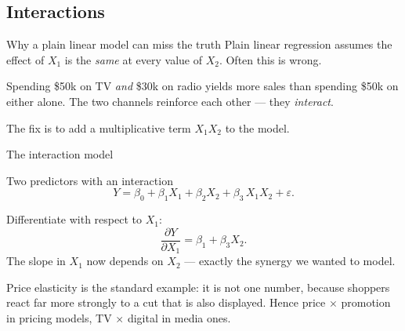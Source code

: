 \documentclass[aspectratio=169,11pt]{beamer}
\begin{document}
\subsection{Interactions}

\begin{frame}{Why a plain linear model can miss the truth}
  Plain linear regression assumes the effect of $X_1$ is the \emph{same}
  at every value of $X_2$. Often this is wrong.
  \begin{numexample}
    Spending \$50k on TV \emph{and} \$30k on radio yields more sales
    than spending \$50k on either alone. The two channels reinforce
    each other --- they \emph{interact}.
  \end{numexample}
  \begin{takeaway}
    The fix is to add a multiplicative term $X_1 X_2$ to the model.
  \end{takeaway}
\end{frame}

\begin{frame}{The interaction model}\label{frm:interact}
  \begin{block}{Two predictors with an interaction}
    \[
      Y = \beta_0 + \beta_1 X_1 + \beta_2 X_2 + \beta_3\,X_1 X_2 + \varepsilon.
    \]
  \end{block}
  \begin{readme}
    Differentiate with respect to $X_1$:
    \[
      \frac{\partial Y}{\partial X_1} = \beta_1 + \beta_3 X_2.
    \]
    The slope in $X_1$ now depends on $X_2$ --- exactly the synergy we
    wanted to model.
  \end{readme}
  Price elasticity is the standard example: it is not one number, because
  shoppers react far more strongly to a cut that is also displayed. Hence
  price $\times$ promotion in pricing models, TV $\times$ digital in media ones.
\end{frame}
\end{document}
